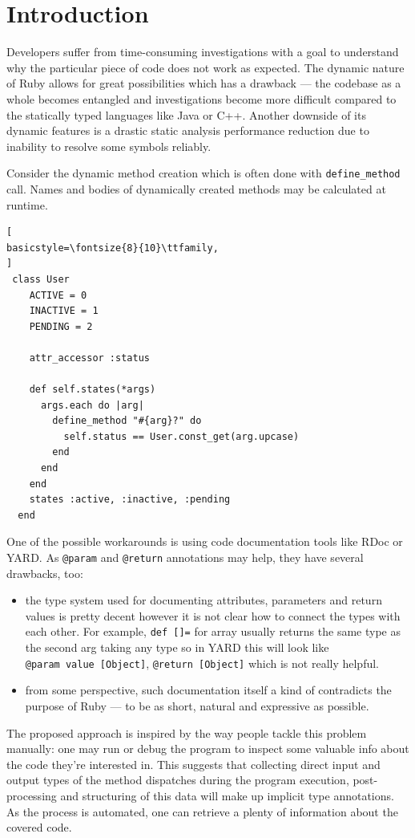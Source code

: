 \documentclass[conference]{IEEEtran}
\begin{document}
\section{Introduction}
Developers suffer from time-consuming investigations with a goal to understand why the particular piece of code does not
work as expected. The dynamic nature of Ruby allows for great possibilities which has a drawback — the codebase as a
whole becomes entangled and investigations become more difficult compared to the statically typed languages like Java or
C++. Another downside of its dynamic features is a drastic static analysis performance reduction due to inability to
resolve some symbols reliably. 

Consider the dynamic method creation which is often done with \texttt{define\_method} call.  Names and bodies of
dynamically created methods may be calculated at runtime\cite{gradual_type}.
\begin{lstlisting}[
basicstyle=\fontsize{8}{10}\ttfamily,
]
 class User
    ACTIVE = 0
    INACTIVE = 1
    PENDING = 2

    attr_accessor :status

    def self.states(*args)
      args.each do |arg|
        define_method "#{arg}?" do
          self.status == User.const_get(arg.upcase)
        end
      end
    end
    states :active, :inactive, :pending
  end
\end{lstlisting}

One of the possible workarounds is using code documentation tools like RDoc or YARD. %
As \texttt{@param} and \texttt{@return} annotations may help, they have several drawbacks, too:

\begin{itemize}  
\item the type system used for documenting attributes, parameters and return values is pretty decent however it is not
  clear how to connect the types with each other. For example, \texttt{def []=} for array usually returns the same type
    as the second arg taking any type so in YARD this will look like \texttt{@param~value~[Object]},
    \texttt{@return~[Object]} which is not really helpful.
\item from some perspective, such documentation itself a kind of contradicts the purpose of Ruby — to be as short,
  natural and expressive as possible. 
\end{itemize}

The proposed approach is inspired by the way people tackle this problem manually: one may run or debug the program to
inspect some valuable info about the code they're interested in. This suggests that collecting direct input and output
types of the method dispatches during the program execution, post-processing and structuring of this data will make up
implicit type annotations. As the process is automated, one can retrieve a plenty of information about the covered code.
\end{document}
